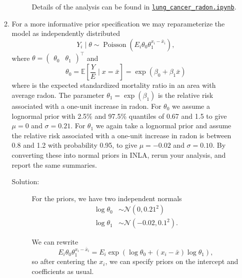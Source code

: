 \documentclass[letterpaper,11pt]{article}
\begin{document}
\begin{enumerate}
\begin{enumerate}
\begin{description}
      Details of the analysis can be found in
      \href{https://nbviewer.jupyter.org/github/ppham27/stat570/blob/master/hw5/lung\_cancer\_radon.ipynb}{\texttt{lung\_cancer\_radon.ipynb}}.
    \end{description}
  \item For a more informative prior specification we may reparameterize the
    model as independently distributed
    \begin{equation}
      Y_i \mid \theta \sim \operatorname{Poisson}\left(
        E_i\theta_0\theta_1^{x_i - \bar{x}_i}
      \right),
    \end{equation}
    where
    $\theta = \begin{pmatrix} \theta_0 & \theta_1\end{pmatrix}^\intercal$ and
    \begin{equation}
      \theta_0 = \mathbb{E}\left[\frac{Y}{E} \mid x = \bar{x}\right]
      = \exp\left(\beta_0 + \beta_1\bar{x}\right)
    \end{equation}
    where is the expected standardized mortality ratio in an area with average
    radon. The parameter $\theta_1 = \exp\left(\beta_1\right)$ is the relative
    risk associated with a one-unit increase in radon.  For $\theta_0$ we assume
    a lognormal prior with 2.5\% and 97.5\% quantiles of 0.67 and 1.5 to give
    $\mu = 0$ and $\sigma = 0.21$. For $\theta_1$ we again take a lognormal
    prior and assume the relative risk associated with a one-unit increase in
    radon is between 0.8 and 1.2 with probability 0.95, to give $\mu = -0.02$
    and $\sigma = 0.10$. By converting these into normal priors in INLA, rerun
    your analysis, and report the same summaries.

    \begin{description}
    \item[Solution:] For the priors, we have two independent normals
      \begin{align*}
        \log\theta_0
        &\sim \mathcal{N}\left(0, 0.21^2\right) \\
        \log\theta_1
        &\sim \mathcal{N}\left(-0.02, 0.1^2\right).
      \end{align*}

      We can rewrite
      \begin{equation}
        E_i\theta_0\theta_1^{x_i - \bar{x}_i} = E_i\exp\left(
          \log\theta_0 + \left(x_i - \bar{x}\right)\log\theta_1
        \right),
      \end{equation}
      so after centering the $x_i$, we can specify priors on the intercept and
      coefficients as usual.


\end{description}
\end{enumerate}
\end{enumerate}
\end{document}
